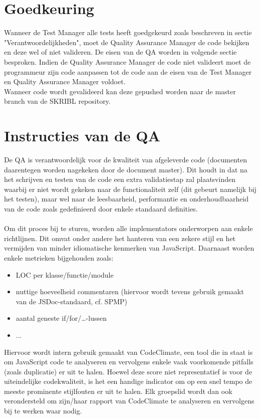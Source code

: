\documentclass{article}
\begin{document}
\section{Goedkeuring}
Wanneer de Test Manager alle tests heeft goedgekeurd zoals beschreven in sectie "Verantwoordelijkheden", moet de Quality Assurance Manager de code bekijken en deze wel of niet valideren. De eisen van de QA worden in volgende sectie besproken. Indien de Quality Assurance Manager de code niet valideert moet de programmeur zijn code aanpassen tot de code aan de eisen van de Test Manager en Quality Assurance Manager voldoet. 
\\
Wanneer code wordt gevalideerd kan deze gepushed worden naar de master branch van de SKRIBL repository.

\section{Instructies van de QA}
De QA is verantwoordelijk voor de kwaliteit van afgeleverde code (documenten daarentegen worden nagekeken door de document master). Dit houdt in dat na het schrijven en testen van de code een extra validatiestap zal plaatsvinden waarbij er niet wordt gekeken naar de functionaliteit zelf (dit gebeurt namelijk bij het testen), maar wel naar de leesbaarheid, performantie en onderhoudbaarheid van de code zoals gedefinieerd door enkele standaard definities. 
\\\\
Om dit proces bij te sturen, worden alle implementators onderworpen aan enkele richtlijnen. Dit omvat onder andere het hanteren van een zekere stijl en het vermijden van minder idiomatische kenmerken van JavaScript. Daarnaast worden enkele metrieken bijgehouden zoals:\\
\begin{itemize}
\item LOC per klasse/functie/module
\item nuttige hoeveelheid commentaren (hiervoor wordt tevens gebruik gemaakt van de JSDoc-standaard, cf. SPMP)
\item aantal geneste if/for/…-lussen
\item ...
\end{itemize}
Hiervoor wordt intern gebruik gemaakt van CodeClimate, een tool die in staat is om JavaScript code te analyseren en vervolgens enkele vaak voorkomende pitfalls (zoals duplicatie) er uit te halen. Hoewel deze score niet representatief is voor de uiteindelijke codekwaliteit, is het een handige indicator om op een snel tempo de meeste prominente stijlfouten er uit te halen. Elk groepslid wordt dan ook verondersteld om zijn/haar rapport van CodeClimate te analyseren en vervolgens bij te werken waar nodig.
\end{document}
